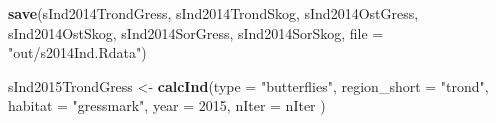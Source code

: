 \documentclass[]{article}
\newenvironment{Shaded}{\begin{snugshade}}{\end{snugshade}}
\newcommand{\KeywordTok}[1]{\textcolor[rgb]{0.13,0.29,0.53}{\textbf{#1}}}
\newcommand{\DataTypeTok}[1]{\textcolor[rgb]{0.13,0.29,0.53}{#1}}
\newcommand{\DecValTok}[1]{\textcolor[rgb]{0.00,0.00,0.81}{#1}}
\newcommand{\StringTok}[1]{\textcolor[rgb]{0.31,0.60,0.02}{#1}}
\newcommand{\NormalTok}[1]{#1}
\begin{document}
\begin{Shaded}
\begin{Highlighting}[]
\KeywordTok{save}\NormalTok{(sInd2014TrondGress, sInd2014TrondSkog, sInd2014OstGress, sInd2014OstSkog, sInd2014SorGress, sInd2014SorSkog, }\DataTypeTok{file =} \StringTok{"out/s2014Ind.Rdata"}\NormalTok{)}
\end{Highlighting}
\end{Shaded}

\begin{Shaded}
\begin{Highlighting}[]
\NormalTok{sInd2015TrondGress <-}\StringTok{ }\KeywordTok{calcInd}\NormalTok{(}\DataTypeTok{type =} \StringTok{"butterflies"}\NormalTok{,}
                              \DataTypeTok{region_short =} \StringTok{"trond"}\NormalTok{,}
                              \DataTypeTok{habitat =} \StringTok{"gressmark"}\NormalTok{,}
                              \DataTypeTok{year =} \DecValTok{2015}\NormalTok{,}
                              \DataTypeTok{nIter =}\NormalTok{ nIter}
\NormalTok{                              )}
       

\end{Highlighting}
\end{Shaded}
\end{document}
